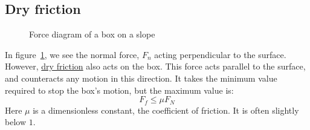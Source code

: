 \documentclass[../Main.tex]{subfiles}
\begin{document}
\subsection{Dry friction}
\begin{figure}[ht]
    \centering
    \caption{Force diagram of a box on a slope}
    \label{figBoxSlopeForces}
\end{figure}
In figure~\ref{figBoxSlopeForces}, we see the normal force, $F_n$ acting perpendicular to the surface. However, \underline{dry friction} also acts on the box. This force acts parallel to the surface, and counteracts any motion in this direction. It takes the minimum value required to stop the box's motion, but the maximum value is:
\begin{equation}
    F_f \leq \mu F_N
\end{equation}
Here $\mu$ is a dimensionless constant, the coefficient of friction. It is often slightly below $1$.\par
\end{document}
